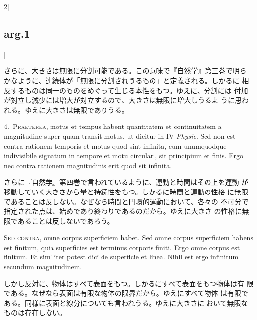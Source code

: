 \documentclass[paper=a4paper,fontsize=10pt,jafontsize=9pt,titlepage]{jlreq}
\begin{document}
\begin{paracol}{2}[\subsection{arg.1}]
\switchcolumn

さらに、大きさは無限に分割可能である。この意味で『自然学』第三巻で明ら
 かなように、連続体が「無限に分割されうるもの」と定義される。しかるに
 相反するものは同一のものをめぐって生じる本性をもつ。ゆえに、分割には
 付加が対立し減少には増大が対立するので、大きさは無限に増大しうるよ
 うに思われる。ゆえに大きさは無限でありうる。


4.~{\scshape Praeterea}, motus et tempus habent quantitatem et continuitatem a
 magnitudine super quam transit motus, ut dicitur in IV {\itshape Physic}. Sed non
 est contra rationem temporis et motus quod sint infinita, cum
 unumquodque indivisibile signatum in tempore et motu circulari, sit
 principium et finis. Ergo nec contra rationem magnitudinis erit quod
 sit infinita.

\switchcolumn

さらに『自然学』第四巻で言われているように、運動と時間はその上を運動
 が移動していく大きさから量と持続性をもつ。しかるに時間と運動の性格
 に無限であることは反しない。なぜなら時間と円環的運動において、各々の
 不可分で指定された点は、始めであり終わりであるのだから。ゆえに大きさ
 の性格に無限であることは反しないであろう。

\switchcolumn*[\subsection{s.c.}]

{\scshape Sed contra}, omne corpus superficiem habet. Sed omne corpus superficiem
 habens est finitum, quia superficies est terminus corporis finiti. Ergo
 omne corpus est finitum. Et similiter potest dici de superficie et
 linea. Nihil est ergo infinitum secundum magnitudinem.

\switchcolumn

しかし反対に、物体はすべて表面をもつ。しかるにすべて表面をもつ物体は有
 限である。なぜなら表面は有限な物体の限界だから。ゆえにすべて物体
 は有限である。同様に表面と線分についても言われうる。ゆえに大きさに
 おいて無限なものは存在しない。



\end{paracol}
\end{document}
